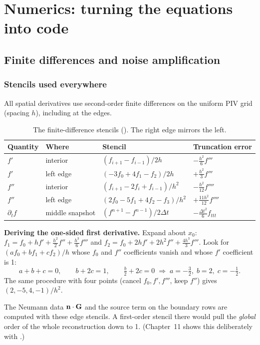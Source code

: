 \part{Numerics: turning the equations into code}

\chapter{Finite differences and noise amplification}

\section{Stencils used everywhere}
All spatial derivatives use second-order finite differences on the uniform PIV grid (spacing $h$), including at the edges.

\begin{table}[H]\centering\small
\begin{tabular}{@{}llll@{}}\toprule
Quantity & Where & Stencil & Truncation error\\\midrule
$f'$ & interior & $(f_{i+1}-f_{i-1})/2h$ & $-\tfrac{h^2}{6}f'''$\\
$f'$ & left edge & $(-3f_0+4f_1-f_2)/2h$ & $+\tfrac{h^2}{3}f'''$\\
$f''$ & interior & $(f_{i+1}-2f_i+f_{i-1})/h^2$ & $-\tfrac{h^2}{12}f''''$\\
$f''$ & left edge & $(2f_0-5f_1+4f_2-f_3)/h^2$ & $+\tfrac{11h^2}{12}f''''$\\
$\partial_t f$ & middle snapshot & $(f^{n+1}-f^{n-1})/2\Delta t$ & $-\tfrac{\Delta t^2}{6}f_{ttt}$\\\bottomrule
\end{tabular}
\caption{The finite-difference stencils (). The right edge mirrors the left.}
\end{table}

\textbf{Deriving the one-sided first derivative.} Expand about $x_0$:
$f_1=f_0+hf'+\tfrac{h^2}{2}f''+\tfrac{h^3}{6}f'''$ and $f_2=f_0+2hf'+2h^2f''+\tfrac{4h^3}{3}f'''$.
Look for $(af_0+bf_1+cf_2)/h$ whose $f_0$ and $f''$ coefficients vanish and whose $f'$ coefficient is 1:
\[
a+b+c=0,\qquad b+2c=1,\qquad \tfrac b2+2c=0 \;\Rightarrow\; a=-\tfrac32,\; b=2,\; c=-\tfrac12 .
\]
The same procedure with four points (cancel $f_0,f',f'''$, keep $f''$) gives $(2,-5,4,-1)/h^2$.

\begin{pitfall}
The Neumann data $\mathbf{n}\cdot\mathbf{G}$ and the source term on the boundary rows are computed with these edge stencils. A first-order stencil there would pull the \emph{global} order of the whole reconstruction down to 1. (Chapter~11 shows this deliberately with .)
\end{pitfall}

